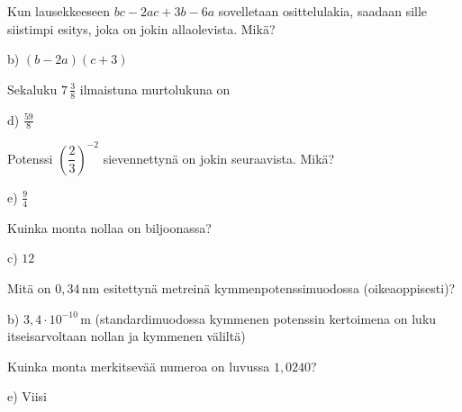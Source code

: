 \begin{tehtava}
Kun lausekkeeseen $bc-2ac+3b-6a$ sovelletaan osittelulakia, saadaan sille siistimpi esitys, joka on jokin allaolevista. Mikä?
    \begin{vastaus}
	b) $(b-2a)(c+3)$
    \end{vastaus}
\end{tehtava}

\begin{tehtava}
Sekaluku $7\,\frac{3}{8}$ ilmaistuna murtolukuna on
    \begin{vastaus}
	 d) $\frac{59}{8}$
    \end{vastaus}
\end{tehtava}

\begin{tehtava}
Potenssi $\left( \dfrac{2}{3} \right)^{-2}$ sievennettynä on jokin seuraavista. Mikä?
\begin{vastaus}
e) $\frac{9}{4}$
\end{vastaus}
\end{tehtava}

\begin{tehtava}
Kuinka monta nollaa on biljoonassa?
\begin{vastaus}
c) $12$
\end{vastaus}
\end{tehtava}

\begin{tehtava}
Mitä on $0,34$\,nm esitettynä metreinä kymmenpotenssimuodossa (oikeaoppisesti)?
\begin{vastaus}
b) $3,4 \cdot 10^{-10}$\,m (standardimuodossa kymmenen potenssin kertoimena on luku itseisarvoltaan nollan ja kymmenen väliltä)
\end{vastaus}
\end{tehtava}

\begin{tehtava}
Kuinka monta merkitsevää numeroa on luvussa $1,0240$?
\begin{vastaus}
e) Viisi
\end{vastaus}
\end{tehtava}

